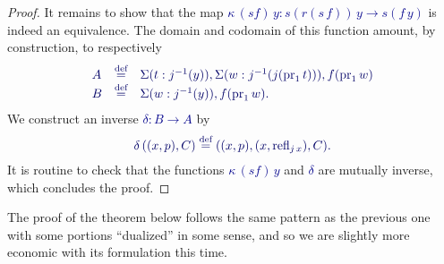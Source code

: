 \documentclass[10pt]{article}
\newcommand{\db}{\textcolor{darkblue}}
\newcommand{\m}[1]{\db{$#1$}}
\newcommand{\M}[1]{\[\db{#1}\]}
\newcommand{\fst}{\operatorname{pr}_1}
\newcommand{\refl}{\operatorname{refl}}
\newcommand{\eqdef}{\overset{\text{def}}{=}}
\theoremstyle{definition}
\begin{document}
\begin{proof}
  It remains to show that the map \m{\kappa \, (s f) \, y : s(r(s \,
    f)) \, y \to s (f \, y)} is indeed an equivalence. The domain and
  codomain of this function amount, by construction, to respectively
  \M{
    \begin{array}{lll}
      A & \eqdef & \Sigma (t : j^{-1}(y)), \Sigma (w : j^{-1}(j (\fst t))), f (\fst w)\\
      B & \eqdef & \Sigma (w : j^{-1}(y)), f(\fst w).
    \end{array}
  }
  We construct an inverse \m{\delta : B \to A} by
  \M{
    \delta \, ((x , p),C) \eqdef ((x , p) , (x , \refl_{j \, x}) , C).
  }
  It is routine to check that the functions \m{\kappa \, (s f) \, y}
  and \m{\delta} are mutually inverse, which concludes the proof.
\end{proof}

The proof of the theorem below follows the same pattern as the
previous one with some portions ``dualized'' in some sense, and so we
are slightly more economic with its formulation this time.
\end{document}
